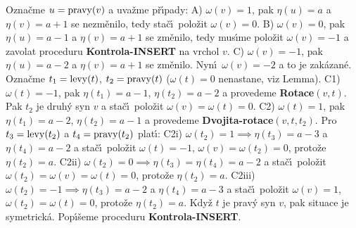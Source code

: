 \flushpar Ozna\v cme $u=\operatorname{pravy}(v)$ a uva\v zme p\v r\'\i pady:\newline 
A) $\omega (v)=1$, pak $\eta (u)=a$ a $\eta (v)=a+1$ se nezm\v enilo, 
tedy sta\v c\'\i\ polo\v zit $\omega (v)=0$.\newline 
B) $\omega (v)=0$, pak $\eta (u)=a-1$ a $\eta (v)=a+1$ se zm\v enilo, 
tedy mus\'\i me polo\v zit $\omega (v)=-1$ a zavolat proceduru 
{\bf Kontrola-INSERT} na vrchol $v$.\newline 
C) $\omega (v)=-1$, pak $\eta (u)=a-2$ a $\eta (v)=a+1$ se zm\v enilo. 
Nyn\'\i\ $\omega (v)=-2$ a to je zak\'azan\'e. Ozna\v cme $t_1=\operatorname{levy}
(t)$, 
$t_2=\operatorname{pravy}(t)$ ($\omega (t)=0$ nenastane, viz Lemma). 
\newline 
C1) $\omega (t)=-1$, pak $\eta (t_1)=a-1$, $\eta (t_2)=a-2$ a provedeme 
{\bf Rotace$(v,t)$}. Pak $t_2$ je druh\'y syn $v$ a sta\v c\'\i\ polo\v zit 
$\omega (v)=\omega (t)=0$.\newline 
C2) $\omega (t)=1$, pak $\eta (t_1)=a-2$, $\eta (t_2)=a-1$ a provedeme 
{\bf Dvojita-rotace$(v,t,t_2)$}. Pro $t_3=\operatorname{levy}(t_2)$ a $t_4=\operatorname{pravy}
(t_2)$ 
plat\'\i :\newline 
C2i) $\omega (t_2)=1\implies\eta (t_3)=a-3$ a $\eta (t_4)=a-2$ a sta\v c\'\i\ 
polo\v zit $\omega (t)=-1$, $\omega (v)=\omega (t_2)=0$, proto\v ze $
\eta (t_2)=a$.\newline 
C2ii) $\omega (t_2)=0\implies\eta (t_3)=\eta (t_4)=a-2$ a sta\v c\'\i\ polo\v zit 
$\omega (t_2)=\omega (v)=\omega (t)=0$, proto\v ze $\eta (t_2)=a$. \newline 
C2iii) $\omega (t_2)=-1\implies\eta (t_3)=a-2$ a $\eta (t_4)=a-3$ a 
sta\v c\'\i\ polo\v zit $\omega (v)=1$, $\omega (t_2)=\omega (t)=
0$, proto\v ze $\eta (t_2)=a$.\newline 
Kdy\v z $t$ je prav\'y syn $v$, pak situace je symetrick\'a.\newline 
Pop\'\i\v seme proceduru {\bf Kontrola-INSERT}.
\medskip

